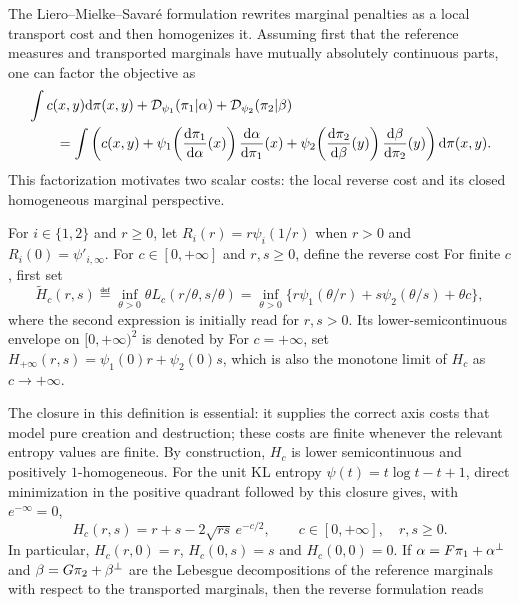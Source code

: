 The Liero--Mielke--Savar\'e formulation rewrites marginal penalties as a local transport cost and then homogenizes it. Assuming first that the reference measures and transported marginals have mutually absolutely continuous parts, one can factor the objective as
\begin{align*}
&\int c(x,y)\mathrm{d}\pi(x,y)
+\mathcal{D}_{\psi_1}(\pi_1|\alpha)+\mathcal{D}_{\psi_2}(\pi_2|\beta) \\
&\qquad =
\int
\left(
	c(x,y)
	+
	\psi_1\!\left(\frac{\mathrm{d}\pi_1}{\mathrm{d}\alpha}(x)\right)\frac{\mathrm{d}\alpha}{\mathrm{d}\pi_1}(x)
	+
	\psi_2\!\left(\frac{\mathrm{d}\pi_2}{\mathrm{d}\beta}(y)\right)\frac{\mathrm{d}\beta}{\mathrm{d}\pi_2}(y)
\right)
\mathrm{d}\pi(x,y).
\end{align*}
This factorization motivates two scalar costs: the local reverse cost and its closed homogeneous marginal perspective.
\begin{defn}\label{def-unbalanced-local-costs}
For $i\in\{1,2\}$ and $r\geq0$, let $R_i(r)=r\psi_i(1/r)$ when $r>0$ and $R_i(0)=\psi'_{i,\infty}$. For $c\in[0,+\infty]$ and $r,s\geq0$, define the reverse cost
For finite $c$, first set
\[
	\widetilde H_c(r,s)
	\eqdef
	\inf_{\theta>0}\theta L_c(r/\theta,s/\theta)
	=
	\inf_{\theta>0}
	\bigl\{r\psi_1(\theta/r)+s\psi_2(\theta/s)+\theta c\bigr\},
\]
where the second expression is initially read for $r,s>0$. Its lower-semicontinuous envelope on $[0,+\infty)^2$ is denoted by
For $c=+\infty$, set $H_{+\infty}(r,s)=\psi_1(0)r+\psi_2(0)s$, which is also the monotone limit of $H_c$ as $c\to+\infty$.
\end{defn}
The closure in this definition is essential: it supplies the correct axis costs that model pure creation and destruction; these costs are finite whenever the relevant entropy values are finite. By construction, $H_c$ is lower semicontinuous and positively $1$-homogeneous. For the unit KL entropy $\psi(t)=t\log t-t+1$, direct minimization in the positive quadrant followed by this closure gives, with $e^{-\infty}=0$,
\[
	H_c(r,s)=r+s-2\sqrt{rs}\,e^{-c/2},
	\qquad c\in[0,+\infty],\quad r,s\geq0.
\]
In particular, $H_c(r,0)=r$, $H_c(0,s)=s$ and $H_c(0,0)=0$.
If $\alpha=F\pi_1+\alpha^\perp$ and $\beta=G\pi_2+\beta^\perp$ are the Lebesgue decompositions of the reference marginals with respect to the transported marginals, then the reverse formulation reads
